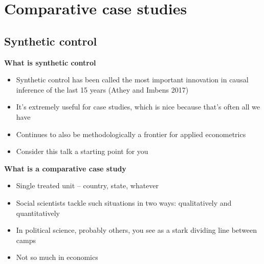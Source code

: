 \documentclass[notes=show]{beamer}
\begin{document}
\section{Comparative case studies}

\subsection{Synthetic control}

\begin{frame}
	\begin{center}
	\textbf{What is synthetic control}
	\end{center}
	
	\begin{itemize}
	\item Synthetic control has been called the most important innovation in causal inference of the last 15 years (Athey and Imbens 2017)
	\item It's extremely useful for case studies, which is nice because that's often all we have
	\item Continues to also be methodologically a frontier for applied econometrics
	\item Consider this talk a starting point for you
	\end{itemize}
\end{frame}
	
\begin{frame}[plain]
\begin{center}
\textbf{What is a comparative case study}
\end{center}

\begin{itemize}
\item Single treated unit -- country, state, whatever
\item Social scientists tackle such situations in two ways: qualitatively and quantitatively
\item In political science, probably others, you see as a stark dividing line between camps
\item Not so much in economics
\end{itemize}

\end{frame}
\end{document}
